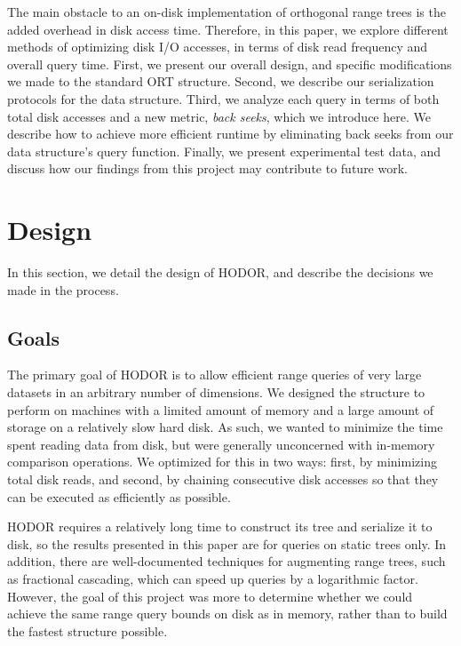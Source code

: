 \documentclass[11pt, oneside]{article}
\begin{document}
The main obstacle to an on-disk implementation of orthogonal range trees is the
added overhead in disk access time. Therefore, in this paper, we explore
different methods of optimizing disk I/O accesses, in terms of disk read
frequency and overall query time. First, we present our overall design, and
specific modifications we made to the standard ORT structure. Second, we
describe our serialization protocols for the data structure. Third, we analyze
each query in terms of both total disk accesses and a new metric,
\textit{back seeks}, which we introduce here. We describe how to achieve more
efficient runtime by eliminating back seeks from our data structure's
query function. Finally, we present experimental test data, and discuss how our
findings from this project may contribute to future work.

\section{Design}

In this section, we detail the design of HODOR, and describe the decisions we
made in the process.

\subsection{Goals}

The primary goal of HODOR is to allow efficient range queries of very large
datasets in an arbitrary number of dimensions. We designed the structure to
perform on machines with a limited amount of memory and a large amount of
storage on a relatively slow hard disk. As such, we wanted to minimize the
time spent reading data from disk, but were generally unconcerned with
in-memory comparison operations. We optimized for this in two ways: first, by
minimizing total disk reads, and second, by chaining consecutive disk accesses
so that they can be executed as efficiently as possible. 

HODOR requires a relatively long time to construct its tree and serialize it to
disk, so the results presented in this paper are for queries on static trees
only. In addition, there are well-documented techniques for augmenting range
trees, such as fractional cascading, which can speed up queries by a logarithmic
factor. However, the goal of this project was more to determine whether we could
achieve the same range query bounds on disk as in memory, rather than to build
the fastest structure possible.
\end{document}
